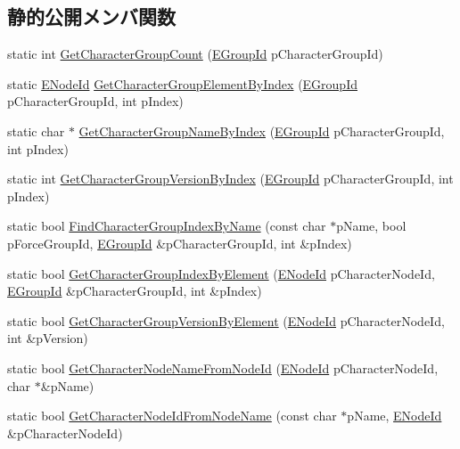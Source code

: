 \subsection*{静的公開メンバ関数}
\begin{DoxyCompactItemize}
\item 
static int \hyperlink{class_fbx_character_a10fbb4a94c4e27e24839ff1ad181af46}{Get\+Character\+Group\+Count} (\hyperlink{class_fbx_character_aa04f2d3cc99d77fe7b9d2066fc9f255e}{E\+Group\+Id} p\+Character\+Group\+Id)
\item 
static \hyperlink{class_fbx_character_ad75bf42026e435ac0ff4d7ece2317be4}{E\+Node\+Id} \hyperlink{class_fbx_character_a8bd837899b9c7cb0579c30486bd3f063}{Get\+Character\+Group\+Element\+By\+Index} (\hyperlink{class_fbx_character_aa04f2d3cc99d77fe7b9d2066fc9f255e}{E\+Group\+Id} p\+Character\+Group\+Id, int p\+Index)
\item 
static char $\ast$ \hyperlink{class_fbx_character_a28897725afd6cbeebff27b980ff6d748}{Get\+Character\+Group\+Name\+By\+Index} (\hyperlink{class_fbx_character_aa04f2d3cc99d77fe7b9d2066fc9f255e}{E\+Group\+Id} p\+Character\+Group\+Id, int p\+Index)
\item 
static int \hyperlink{class_fbx_character_a1881005b51b372f7b9238da7fdcf5367}{Get\+Character\+Group\+Version\+By\+Index} (\hyperlink{class_fbx_character_aa04f2d3cc99d77fe7b9d2066fc9f255e}{E\+Group\+Id} p\+Character\+Group\+Id, int p\+Index)
\item 
static bool \hyperlink{class_fbx_character_adca9207dfaffda7b98ea1b70c88fa0f3}{Find\+Character\+Group\+Index\+By\+Name} (const char $\ast$p\+Name, bool p\+Force\+Group\+Id, \hyperlink{class_fbx_character_aa04f2d3cc99d77fe7b9d2066fc9f255e}{E\+Group\+Id} \&p\+Character\+Group\+Id, int \&p\+Index)
\item 
static bool \hyperlink{class_fbx_character_a0f42325e394e7ec5184a7c396d4b1b4a}{Get\+Character\+Group\+Index\+By\+Element} (\hyperlink{class_fbx_character_ad75bf42026e435ac0ff4d7ece2317be4}{E\+Node\+Id} p\+Character\+Node\+Id, \hyperlink{class_fbx_character_aa04f2d3cc99d77fe7b9d2066fc9f255e}{E\+Group\+Id} \&p\+Character\+Group\+Id, int \&p\+Index)
\item 
static bool \hyperlink{class_fbx_character_adca146a3155027af9ea82513fa614ef1}{Get\+Character\+Group\+Version\+By\+Element} (\hyperlink{class_fbx_character_ad75bf42026e435ac0ff4d7ece2317be4}{E\+Node\+Id} p\+Character\+Node\+Id, int \&p\+Version)
\item 
static bool \hyperlink{class_fbx_character_ad7162048fc5ab287acafcef3a0088c38}{Get\+Character\+Node\+Name\+From\+Node\+Id} (\hyperlink{class_fbx_character_ad75bf42026e435ac0ff4d7ece2317be4}{E\+Node\+Id} p\+Character\+Node\+Id, char $\ast$\&p\+Name)
\item 
static bool \hyperlink{class_fbx_character_af7a49eb6a3936fc9d45d734e23d9ab1e}{Get\+Character\+Node\+Id\+From\+Node\+Name} (const char $\ast$p\+Name, \hyperlink{class_fbx_character_ad75bf42026e435ac0ff4d7ece2317be4}{E\+Node\+Id} \&p\+Character\+Node\+Id)
\end{DoxyCompactItemize}
